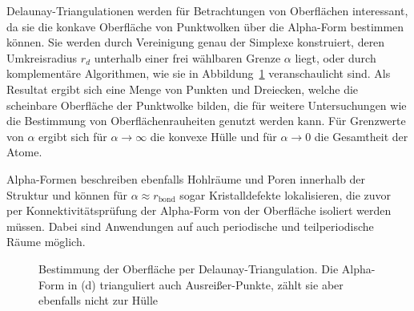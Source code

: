 Delaunay-Triangulationen werden für Betrachtungen von Oberflächen interessant, da sie die konkave Oberfläche von Punktwolken über die Alpha-Form bestimmen können.
Sie werden durch Vereinigung genau der Simplexe konstruiert, deren Umkreisradius $r_d$ unterhalb einer frei wählbaren Grenze $\alpha$ liegt, oder durch komplementäre Algorithmen, wie sie in Abbildung~\ref{fig:delaunay-alpha} veranschaulicht sind.
Als Resultat ergibt sich eine Menge von Punkten und Dreiecken, welche die scheinbare Oberfläche der Punktwolke bilden, die für weitere Untersuchungen wie die Bestimmung von Oberflächenrauheiten genutzt werden kann.
Für Grenzwerte von $\alpha$ ergibt sich für $\alpha \rightarrow \infty$ die konvexe Hülle und für $\alpha \rightarrow 0$ die Gesamtheit der Atome.

Alpha-Formen beschreiben ebenfalls Hohlräume und Poren innerhalb der Struktur und können für $\alpha \approx r_\text{bond}$ sogar Kristalldefekte lokalisieren, die zuvor per Konnektivitätsprüfung der Alpha-Form von der Oberfläche isoliert werden müssen.
Dabei sind Anwendungen auf auch periodische und teilperiodische Räume möglich.

\begin{figure}[H]
  \centering
  \vspace{2em}
  \caption[Bestimmung der Oberfläche per Delaunay-Triangulation]{
    Bestimmung der Oberfläche per Delaunay-Triangulation.
    Die Alpha-Form in (d) trianguliert auch Ausreißer-Punkte, zählt sie aber ebenfalls nicht zur Hülle
  }
  \label{fig:delaunay-alpha}
\end{figure}
